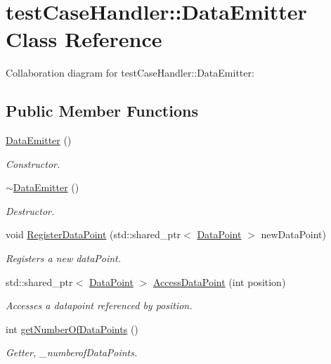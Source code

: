 \hypertarget{classtestCaseHandler_1_1DataEmitter}{}\section{test\+Case\+Handler\+::Data\+Emitter Class Reference}
\label{classtestCaseHandler_1_1DataEmitter}


Collaboration diagram for test\+Case\+Handler\+::Data\+Emitter\+:
\subsection*{Public Member Functions}
\begin{DoxyCompactItemize}
\item 
\mbox{\label{classtestCaseHandler_1_1DataEmitter_a7c8a6cec71218fad4f71d1c455f36340}} 
\mbox{\hyperlink{classtestCaseHandler_1_1DataEmitter_a7c8a6cec71218fad4f71d1c455f36340}{Data\+Emitter}} ()
\begin{DoxyCompactList}\small\item\em Constructor. \end{DoxyCompactList}\item 
\mbox{\label{classtestCaseHandler_1_1DataEmitter_a1c9d0b3ac274028dc0d435df32c5529f}} 
\mbox{\hyperlink{classtestCaseHandler_1_1DataEmitter_a1c9d0b3ac274028dc0d435df32c5529f}{$\sim$\+Data\+Emitter}} ()
\begin{DoxyCompactList}\small\item\em Destructor. \end{DoxyCompactList}\item 
void \mbox{\hyperlink{classtestCaseHandler_1_1DataEmitter_aaedea07c78568b7f97716b731dc48c01}{Register\+Data\+Point}} (std\+::shared\+\_\+ptr$<$ \mbox{\hyperlink{classtestCaseHandler_1_1DataPoint}{Data\+Point}} $>$ new\+Data\+Point)
\begin{DoxyCompactList}\small\item\em Registers a new data\+Point. \end{DoxyCompactList}\item 
std\+::shared\+\_\+ptr$<$ \mbox{\hyperlink{classtestCaseHandler_1_1DataPoint}{Data\+Point}} $>$ \mbox{\hyperlink{classtestCaseHandler_1_1DataEmitter_ae60b24d8b19793ab7cdac998e8c6c378}{Access\+Data\+Point}} (int position)
\begin{DoxyCompactList}\small\item\em Accesses a datapoint referenced by position. \end{DoxyCompactList}\item 
int \mbox{\hyperlink{classtestCaseHandler_1_1DataEmitter_a608067af5e211ed5bec32d8f319e0842}{get\+Number\+Of\+Data\+Points}} ()
\begin{DoxyCompactList}\small\item\em Getter, \+\_\+numberof\+Data\+Points. \end{DoxyCompactList}\end{DoxyCompactItemize}


